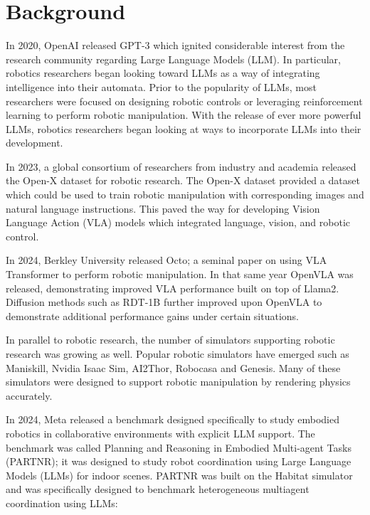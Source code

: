 \section{Background}

In 2020, OpenAI released GPT-3\cite{brown2020languagemodelsfewshotlearners} which ignited considerable interest from the research community regarding Large Language Models (LLM).  In particular, robotics researchers began looking toward LLMs as a way of integrating intelligence into their automata.  Prior to the popularity of LLMs, most researchers were focused on designing robotic controls or leveraging reinforcement learning\cite{mu2021maniskillgeneralizablemanipulationskill} to perform robotic manipulation.  With the release of ever more powerful LLMs, robotics researchers began looking at ways to incorporate LLMs into their development.

In 2023, a global consortium of researchers from industry and academia released the Open-X\cite{embodimentcollaboration2024openxembodimentroboticlearning} dataset for robotic research. The Open-X dataset provided a dataset which could be used to train robotic manipulation with corresponding images and natural language instructions.  This paved the way for developing Vision Language Action (VLA) models which integrated language, vision, and robotic control.

In 2024, Berkley University released  Octo\cite{octomodelteam2024octoopensourcegeneralistrobot}; a seminal paper on using VLA Transformer to perform robotic manipulation.  In that same year OpenVLA\cite{kim2024openvlaopensourcevisionlanguageactionmodel} was released, demonstrating improved VLA performance built on top of Llama2\cite{touvron2023llama2openfoundation}.  Diffusion methods such as RDT-1B\cite{liu2025rdt1bdiffusionfoundationmodel} further improved upon OpenVLA to demonstrate additional performance gains under certain situations.

In parallel to robotic research, the number of simulators supporting robotic research was growing as well.  Popular robotic simulators have emerged such as Maniskill\cite{mu2021maniskillgeneralizablemanipulationskill}, Nvidia Isaac Sim\cite{mittal2023orbit}, AI2Thor\cite{kolve2022ai2thorinteractive3denvironment}, Robocasa\cite{robocasa2024} and Genesis\cite{Genesis}.  Many of these simulators were designed to support robotic manipulation by rendering physics accurately.

In 2024, Meta released a benchmark designed specifically to study embodied robotics in collaborative environments with explicit LLM support.  The benchmark was called Planning and Reasoning in Embodied Multi-agent Tasks (PARTNR)\cite{chang2024partnrbenchmarkplanningreasoning}; it was designed to study robot coordination using Large Language Models (LLMs) for indoor scenes.  PARTNR was built on the Habitat\cite{savva2019habitatplatformembodiedai} simulator and was specifically designed to benchmark heterogeneous multiagent coordination using LLMs:

